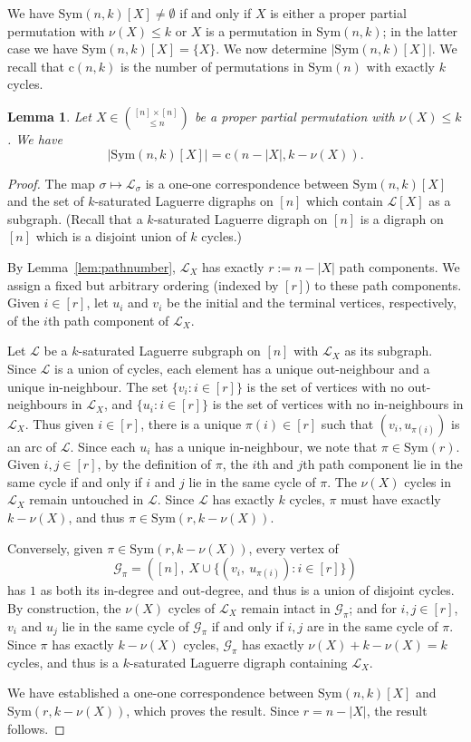 \documentclass{amsart}
\newtheorem{lem}[thm]{Lemma}
\newcommand{\cy}{\nu}
\newcommand{\mcal}{\mathcal}
\newcommand{\sym}{\mathrm{Sym}}
\newcommand{\st}{\mathrm{c}}
\begin{document}
We have $\sym(n,k)[X]\neq \emptyset$ if and only if $X$ is either a proper partial permutation with $\cy(X)\leq k$ or $X$ is a permutation in $\sym(n,k)$; in the latter case we have $\sym(n,k)[X]=\{X\}$. We now determine $|\sym(n,k)[X]|$. We recall that $\st(n,k)$ is the number of permutations in $\sym(n)$ with exactly $k$ cycles.

\begin{lem}\label{lem:size}
Let $X\in \binom{[n]\times [n]}{\leq n}$ be a proper partial permutation with $\cy(X)\leq k$. We have
 \[|\sym(n,k)[X]| = \st(n-|X|,k-\cy(X)).\]   
\end{lem}
\begin{proof}
The map $\sigma \mapsto \mcal{L}_{\sigma}$ is a one-one correspondence between $\sym(n,k)[X]$ and the set of $k$-saturated Laguerre digraphs on $[n]$ which contain $\mcal{L}[X]$ as a subgraph. (Recall that a $k$-saturated Laguerre digraph on $[n]$ is a digraph on $[n]$ which is a disjoint union of $k$ cycles.)

By Lemma~\ref{lem:pathnumber}, $\mcal{L}_{X}$ has exactly $r:=n-|X|$ path components. We assign a fixed but arbitrary ordering (indexed by $[r]$) to these path components. Given $i \in \left[r \right]$, let $u_{i}$ and $v_{i}$ be the initial and the terminal vertices, respectively, of the $i$th path component of $\mcal{L}_{X}$.

Let $\mcal{L}$ be a $k$-saturated Laguerre subgraph on $[n]$ with $\mcal{L}_{X}$ as its subgraph. Since $\mcal{L}$ is a union of cycles, each element has a unique out-neighbour and a unique in-neighbour. The set $\{v_{i} \colon i \in [r]\}$ is the set of vertices with no out-neighbours in $\mcal{L}_{X}$, and $\{u_{i} \colon i \in [r]\}$ is the set of vertices with no in-neighbours in $\mcal{L}_{X}$. Thus given $i \in [r]$, there is a unique $\pi(i) \in [r]$ such that $(v_{i}, u_{\pi(i)})$ is an arc of $\mcal{L}$. Since each $u_{i}$ has a unique in-neighbour, we note that $\pi \in \sym(r)$. Given $i,j\in [r]$, by the definition of $\pi$, the $i$th and $j$th path component lie in the same cycle if and only if $i$ and $j$ lie in the same cycle of $\pi$. The $\cy(X)$ cycles in $\mcal{L}_{X}$ remain untouched in $\mcal{L}$. Since $\mcal{L}$ has exactly $k$ cycles, $\pi$ must have exactly $k-\cy(X)$, and thus $\pi \in \sym(r,k-\cy(X))$.      
 
Conversely, given $\pi \in \sym(r,k-\cy(X))$, every vertex of \[\mcal{G}_{\pi}=\left([n],\ X\cup\{(v_{i},\ u_{\pi(i)})\colon i \in [r]\} \right)\] has $1$ as both its in-degree and out-degree, and thus is a union of disjoint cycles. By construction, the $\cy(X)$ cycles of $\mcal{L}_{X}$ remain intact in $\mcal{G}_{\pi}$; and for $i,j\in [r]$, $v_{i}$ and $u_{j}$ lie in the same cycle of $\mcal{G}_{\pi}$ if and only if $i,j$ are in the same cycle of $\pi$. Since $\pi$ has exactly $k-\cy(X)$ cycles, $\mcal{G}_{\pi}$ has exactly $\cy(X)+k-\cy(X)=k$ cycles, and thus is a $k$-saturated Laguerre digraph containing $\mcal{L}_{X}$.  

We have established a one-one correspondence between $\sym(n,k)[X]$ and\\ $\sym(r,k-\cy(X))$, which proves the result. Since $r=n-|X|$, the result follows.  
\end{proof}
\end{document}
